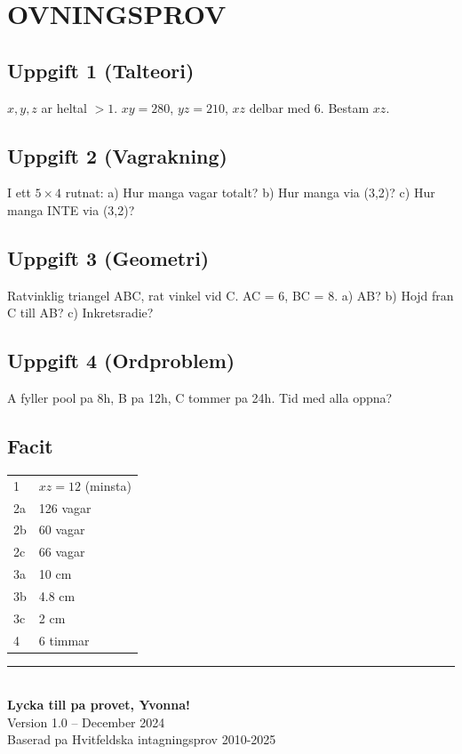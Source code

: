 \documentclass[11pt,a4paper]{article}
\begin{document}
\section{OVNINGSPROV}

\subsection{Uppgift 1 (Talteori)}
$x, y, z$ ar heltal $> 1$. $xy = 280$, $yz = 210$, $xz$ delbar med 6. Bestam $xz$.

\subsection{Uppgift 2 (Vagrakning)}
I ett $5 \times 4$ rutnat: a) Hur manga vagar totalt? b) Hur manga via (3,2)? c) Hur manga INTE via (3,2)?

\subsection{Uppgift 3 (Geometri)}
Ratvinklig triangel ABC, rat vinkel vid C. AC = 6, BC = 8. a) AB? b) Hojd fran C till AB? c) Inkretsradie?

\subsection{Uppgift 4 (Ordproblem)}
A fyller pool pa 8h, B pa 12h, C tommer pa 24h. Tid med alla oppna?

\subsection{Facit}
\begin{tabular}{|l|l|}
\hline
1 & $xz = 12$ (minsta) \\
2a & 126 vagar \\
2b & 60 vagar \\
2c & 66 vagar \\
3a & 10 cm \\
3b & 4.8 cm \\
3c & 2 cm \\
4 & 6 timmar \\
\hline
\end{tabular}

\vfill
\begin{center}
\rule{10cm}{0.5pt}\\[0.5cm]
{\Large\textbf{Lycka till pa provet, Yvonna!}}\\[0.3cm]
Version 1.0 -- December 2024\\
Baserad pa Hvitfeldska intagningsprov 2010-2025
\end{center}
\end{document}
